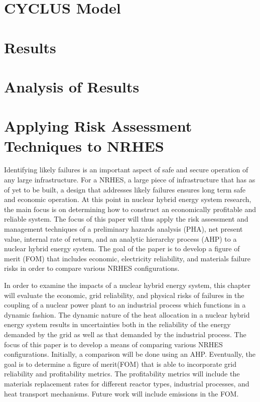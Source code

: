 \documentclass[12pt]{UIdahoMastersThesis}
\begin{document}
\chapter{CYCLUS Model}

\chapter{Results}

\chapter{Analysis of Results}

\chapter{Applying Risk Assessment Techniques to NRHES}

Identifying likely failures is an important aspect of safe and secure operation of any large infrastructure. For a NRHES, a large piece of infrastructure that has as of yet to be built, a design that addresses likely failures ensures long term safe and economic operation.  At this point in nuclear hybrid energy system research, the main focus is on determining how to construct an economically profitable and reliable system.  The focus of this paper will thus apply the risk assessment and management techniques of a preliminary hazards analysis (PHA), net present value, internal rate of return, and an analytic hierarchy process (AHP) to a nuclear hybrid energy system.  The goal of the paper is to develop a figure of merit (FOM) that includes economic, electricity reliability, and materials failure risks in order to compare various NRHES configurations.  

In order to examine the impacts of a nuclear hybrid energy system, this chapter will evaluate the economic, grid reliability, and physical risks of failures in the coupling of a nuclear power plant to an industrial process which functions in a dynamic fashion. The dynamic nature of the heat allocation in a nuclear hybrid energy system results in uncertainties both in the reliability of the energy demanded by the grid as well as that demanded by the industrial process. The focus of this paper is to develop a means of comparing various NRHES configurations. Initially, a comparison will be done using an AHP.  Eventually, the goal is to determine a figure of merit(FOM) that is able to incorporate grid reliability and profitability metrics.  The profitability metrics will include the materials replacement rates for different reactor types, industrial processes, and heat transport mechanisms. Future work will include emissions in the FOM. 
\end{document}
